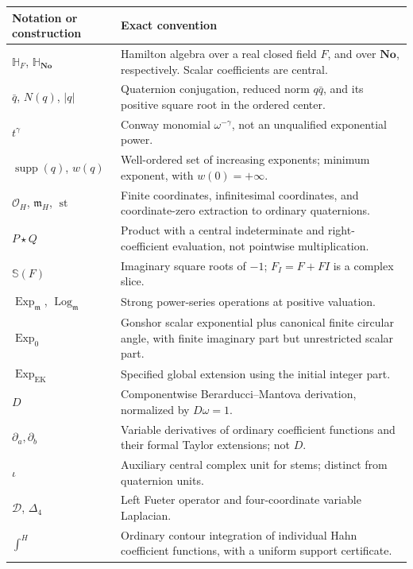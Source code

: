 \documentclass[11pt,letterpaper]{article}
\numberwithin{equation}{section}
\theoremstyle{definition}
\theoremstyle{remark}
\newcommand{\No}{\mathbf{No}}
\newcommand{\SQ}{\mathbb H_{\No}}
\newcommand{\HF}{\mathbb H_F}
\newcommand{\OO}{\mathcal O}
\newcommand{\mm}{\mathfrak m}
\newcommand{\st}{\operatorname{st}}
\newcommand{\supp}{\operatorname{supp}}
\newcommand{\Exp}{\operatorname{Exp}}
\newcommand{\Log}{\operatorname{Log}}
\newcommand{\DD}{\mathcal D}
\begin{document}
\begin{longtable}{L{0.23\textwidth}L{0.67\textwidth}}
\toprule
Notation or construction & Exact convention\\
\midrule
\endhead
$\HF$, $\SQ$ & Hamilton algebra over a real closed field $F$, and over $\No$, respectively.
Scalar coefficients are central.\\
$\bar q$, $N(q)$, $|q|$ & Quaternion conjugation, reduced norm $q\bar q$, and its positive
square root in the ordered center.\\
$t^\gamma$ & Conway monomial $\omega^{-\gamma}$, not an unqualified exponential power.\\
$\supp(q)$, $w(q)$ & Well-ordered set of increasing exponents; minimum exponent, with
$w(0)=+\infty$.\\
$\OO_H$, $\mm_H$, $\st$ & Finite coordinates, infinitesimal coordinates, and coordinate-zero
extraction to ordinary quaternions.\\
$P\star Q$ & Product with a central indeterminate and right-coefficient evaluation, not
pointwise multiplication.\\
$\mathbb S(F)$ & Imaginary square roots of $-1$; $F_I=F+FI$ is a complex slice.\\
$\Exp_{\mm}$, $\Log_{\mm}$ & Strong power-series operations at positive valuation.\\
$\Exp_0$ & Gonshor scalar exponential plus canonical finite circular angle, with finite
imaginary part but unrestricted scalar part.\\
$\Exp_{\mathrm{EK}}$ & Specified global extension using the initial integer part.\\
$D$ & Componentwise Berarducci--Mantova derivation, normalized by $D\omega=1$.\\
$\partial_a,\partial_b$ & Variable derivatives of ordinary coefficient functions and their
formal Taylor extensions; not $D$.\\
$\iota$ & Auxiliary central complex unit for stems; distinct from quaternion units.\\
$\DD$, $\Delta_4$ & Left Fueter operator and four-coordinate variable Laplacian.\\
$\int^H$ & Ordinary contour integration of individual Hahn coefficient functions, with a
uniform support certificate.\\
\bottomrule
\end{longtable}
\end{document}
